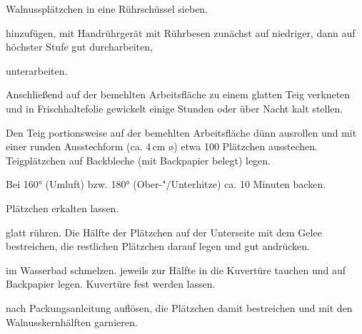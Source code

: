\begin{recipe}{Walnussplätzchen}
  in eine Rührschüssel sieben.

  hinzufügen, mit Handrührgerät mit Rührbesen zunächst auf niedriger,
  dann auf höchster Stufe gut durcharbeiten,

  unterarbeiten.

  Anschließend auf der bemehlten Arbeitsfläche zu einem glatten Teig
  verkneten und in Frischhaltefolie gewickelt einige Stunden oder über
  Nacht kalt stellen.

  Den Teig portionsweise auf der bemehlten Arbeitsfläche dünn ausrollen
  und mit einer runden Ausstechform (ca. 4\,cm \o) etwa 100 Plätzchen
  ausstechen. Teigplätzchen auf Backbleche (mit Backpapier belegt)
  legen.

  Bei 160° (Umluft) bzw. 180° (Ober-"/Unterhitze) ca. 10 Minuten backen.

  Plätzchen erkalten lassen.

  glatt rühren.
  Die Hälfte der Plätzchen auf der Unterseite mit dem Gelee bestreichen,
  die restlichen Plätzchen darauf legen und gut andrücken.

  im Wasserbad schmelzen.
  jeweils zur Hälfte in die Kuvertüre tauchen und auf Backpapier legen.
  Kuvertüre fest werden lassen.

  nach Packungsanleitung auflösen, die Plätzchen damit bestreichen und
  mit den Walnusskernhälften garnieren.
\end{recipe}



